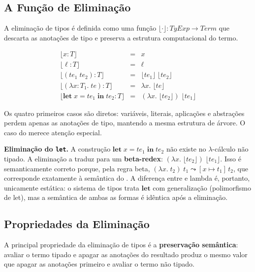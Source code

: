   \subsection{A Função de Eliminação}

  A eliminação de tipos é definida como uma função \(\lfloor \cdot \rfloor :
  \mathit{TyExp} \to \mathit{Term}\) que descarta as anotações de tipo e
  preserva a estrutura computacional do termo.

  \[
    \begin{array}{rcl}
      \lfloor x : T \rfloor & = & x \\[4pt]
      \lfloor \ell : T \rfloor & = & \ell \\[4pt]
      \lfloor (te_1\; te_2) : T \rfloor & = & \lfloor te_1 \rfloor\;
      \lfloor te_2 \rfloor \\[4pt]
      \lfloor (\lambda x {:} T_1.\; te) : T \rfloor & = & \lambda x.\;
      \lfloor te \rfloor \\[4pt]
      \lfloor \mathbf{let}\; x = te_1\; \mathbf{in}\; te_2 : T \rfloor & = &
      (\lambda x.\; \lfloor te_2 \rfloor)\; \lfloor te_1 \rfloor
    \end{array}
  \]

  Os quatro primeiros casos são diretos: variáveis, literais, aplicações e
  abstrações perdem apenas as anotações de tipo, mantendo a mesma estrutura
  de árvore. O caso do  merece atenção especial.

  \textbf{Eliminação do \texttt{let}.} A construção \(\mathbf{let}\; x =
  te_1\; \mathbf{in}\; te_2\) não existe no $\lambda$-cálculo não tipado. A
  eliminação a traduz para um \textbf{beta-redex}: \((\lambda x.\; \lfloor
  te_2 \rfloor)\; \lfloor te_1 \rfloor\). Isso é semanticamente correto
  porque, pela regra beta, \((\lambda x.\; t_2)\; t_1 \leadsto
  [x \mapsto t_1]\, t_2\), que corresponde exatamente à semântica do
  . A diferença entre  e lambda é, portanto,
  unicamente estática: o sistema de tipos trata \(\mathbf{let}\) com
  generalização (polimorfismo de let), mas a semântica de ambas as formas é
  idêntica após a eliminação.

  \subsection{Propriedades da Eliminação}

  A principal propriedade da eliminação de tipos é a
  \textbf{preservação semântica}: avaliar o termo tipado e apagar as
  anotações do resultado produz o mesmo valor que apagar as anotações
  primeiro e avaliar o termo não tipado.

